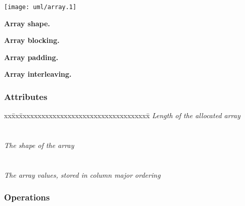 \documentclass{article}
\begin{document}


\centerline{\texttt{[image: uml/array.1]}}

\textbf{Array shape.}

\textbf{Array blocking.}

\textbf{Array padding.}

\textbf{Array interleaving.}


\subsubsection{Attributes}

\begin{tabbing}
xx\=xx\=xxxxxxxxxxxxxxxxxxxxxxxxxxxxxxxxxxx\= \kill
\> \todo \>  \textit{Length of the allocated array} \\
\>       \>       \\ \\
\> \todo \>  \textit {The shape of the array} \\
\>       \>   \\ \\
\> \todo \>  \textit {The array values, stored in column major ordering}\\
\>       \> 
\end{tabbing}

\subsubsection{Operations}
\end{document}

